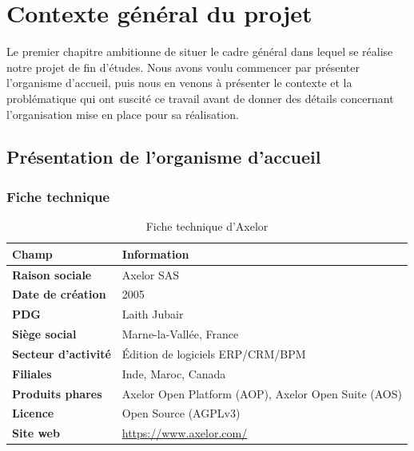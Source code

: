 \chapter{Contexte général du projet}
\label{chap:contexte}

Le premier chapitre ambitionne de situer le cadre général dans lequel se réalise notre projet de fin d'études. Nous avons voulu commencer par présenter l'organisme d'accueil, puis nous en venons à présenter le contexte et la problématique qui ont suscité ce travail avant de donner des détails concernant l'organisation mise en place pour sa réalisation.

\section{Présentation de l'organisme d'accueil}
\label{sec:organisme}

\subsection{Fiche technique}

\begin{table}[H]
  \centering
  \renewcommand{\arraystretch}{1.5}
  \begin{tabular}{p{4.5cm} p{9.5cm}}
    \toprule
    \rowcolor{gray!20}
    \textbf{Champ} & \textbf{Information} \\
    \midrule
    \rowcolor{gray!5}
    \textbf{Raison sociale}     & Axelor SAS \\
    \textbf{Date de création}   & 2005 \\
    \rowcolor{gray!5}
    \textbf{PDG}                & Laith Jubair \\
    \textbf{Siège social}       & Marne-la-Vallée, France \\
    \rowcolor{gray!5}
    \textbf{Secteur d'activité} & Édition de logiciels ERP/CRM/BPM \\
    \textbf{Filiales}           & Inde, Maroc, Canada \\
    \rowcolor{gray!5}
    \textbf{Produits phares}    & Axelor Open Platform (AOP), Axelor Open Suite (AOS) \\
    \textbf{Licence}            & Open Source (AGPLv3) \\
    \rowcolor{gray!5}
    \textbf{Site web}           & \url{https://www.axelor.com/} \\
    \bottomrule
  \end{tabular}
  \caption{Fiche technique d'Axelor}
  \label{tab:fiche-technique}
\end{table}

